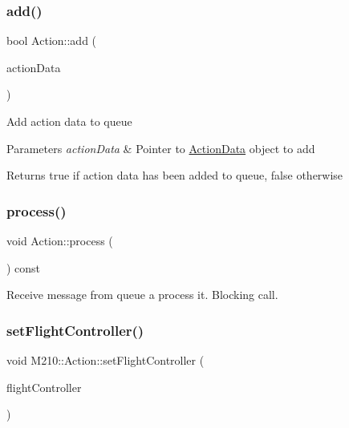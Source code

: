 \subsubsection{\texorpdfstring{add()}{add()}}
{\footnotesize\ttfamily bool Action\+::add (\begin{DoxyParamCaption}\item[{const \mbox{\hyperlink{class_m210_1_1_action_data}{Action\+Data}} $\ast$}]{action\+Data }\end{DoxyParamCaption})}

Add action data to queue 
\begin{DoxyParams}{Parameters}
{\em action\+Data} & Pointer to \mbox{\hyperlink{class_m210_1_1_action_data}{Action\+Data}} object to add \\
\hline
\end{DoxyParams}
\begin{DoxyReturn}{Returns}
true if action data has been added to queue, false otherwise 
\end{DoxyReturn}
\mbox{\label{class_m210_1_1_action_a38eac84b9b832225548d16d37b16ffbd}} 
\subsubsection{\texorpdfstring{process()}{process()}}
{\footnotesize\ttfamily void Action\+::process (\begin{DoxyParamCaption}{ }\end{DoxyParamCaption}) const}

Receive message from queue a process it. Blocking call. \mbox{\label{class_m210_1_1_action_a2079c96a8a88d045037c730f3f752d25}} 
\subsubsection{\texorpdfstring{set\+Flight\+Controller()}{setFlightController()}}
{\footnotesize\ttfamily void M210\+::\+Action\+::set\+Flight\+Controller (\begin{DoxyParamCaption}\item[{\mbox{\hyperlink{class_m210_1_1_flight_controller}{Flight\+Controller}} $\ast$}]{flight\+Controller }\end{DoxyParamCaption})\hspace{0.3cm}{\ttfamily [inline]}}

